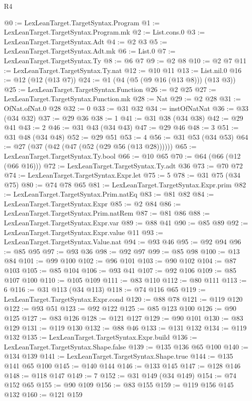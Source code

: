 \begin{lexlean}{R4}
\begin{coremodule}
@0 := LexLeanTarget.TargetSyntax.Program
@1 := LexLeanTarget.TargetSyntax.Program.mk
@2 := List.cons.{0}
@3 := LexLeanTarget.TargetSyntax.Adt
@4 := @2 @3
@5 := LexLeanTarget.TargetSyntax.Adt.mk
@6 := List.{0}
@7 := LexLeanTarget.TargetSyntax.Ty
@8 := @6 @7
@9 := @2 @8
@10 := @2 @7
@11 := LexLeanTarget.TargetSyntax.Ty.nat
@12 := @10 @11
@13 := List.nil.{0}
@16 := @12 (@12 (@13 @7))
@24 := @1 (@4 (@5 (@9 @16 (@13 @8))) (@13 @3))
@25 := LexLeanTarget.TargetSyntax.Function
@26 := @2 @25
@27 := LexLeanTarget.TargetSyntax.Function.mk
@28 := Nat
@29 := @2 @28
@31 := OfNat.ofNat.{0} @28
@32 := 0
@33 := @31 @32
@34 := instOfNatNat
@36 := @33 (@34 @32)
@37 := @29 @36
@38 := 1
@41 := @31 @38 (@34 @38)
@42 := @29 @41
@43 := 2
@46 := @31 @43 (@34 @43)
@47 := @29 @46
@48 := 3
@51 := @31 @48 (@34 @48)
@52 := @29 @51
@53 := 4
@56 := @31 @53 (@34 @53)
@64 := @27 (@37 (@42 (@47 (@52 (@29 @56 (@13 @28))))))
@65 := LexLeanTarget.TargetSyntax.Ty.bool
@66 := @10 @65
@70 := @64 (@66 (@12 (@66 @16)))
@72 := LexLeanTarget.TargetSyntax.Ty.adt @36
@73 := @70 @72
@74 := LexLeanTarget.TargetSyntax.Expr.let
@75 := 5
@78 := @31 @75 (@34 @75)
@80 := @74 @78 @65
@81 := LexLeanTarget.TargetSyntax.Expr.prim
@82 := LexLeanTarget.TargetSyntax.Prim.natEq
@83 := @81 @82
@84 := LexLeanTarget.TargetSyntax.Expr
@85 := @2 @84
@86 := LexLeanTarget.TargetSyntax.Prim.natRem
@87 := @81 @86
@88 := LexLeanTarget.TargetSyntax.Expr.var
@89 := @88 @41
@90 := @85 @89
@92 := LexLeanTarget.TargetSyntax.Expr.value @11
@93 := LexLeanTarget.TargetSyntax.Value.nat
@94 := @93 @46
@95 := @92 @94
@96 := @85 @95
@97 := @93 @36
@98 := @92 @97
@99 := @85 @98
@100 := @13 @84
@101 := @99 @100
@102 := @96 @101
@103 := @90 @102
@104 := @87 @103
@105 := @85 @104
@106 := @93 @41
@107 := @92 @106
@109 := @85 @107 @100
@110 := @105 @109
@111 := @83 @110
@112 := @80 @111
@113 := 6
@116 := @31 @113 (@34 @113)
@118 := @74 @116 @65
@119 := LexLeanTarget.TargetSyntax.Expr.cond
@120 := @88 @78
@121 := @119 @120
@122 := @93 @51
@123 := @92 @122
@125 := @85 @123 @100
@126 := @90 @125
@127 := @83 @126
@128 := @121 @127
@129 := @90 @101
@130 := @83 @129
@131 := @119 @130
@132 := @88 @46
@133 := @131 @132
@134 := @119 @132
@135 := LexLeanTarget.TargetSyntax.Expr.build
@136 := LexLeanTarget.TargetSyntax.Shape.false
@139 := @135 @136 @65 @100
@140 := @134 @139
@141 := LexLeanTarget.TargetSyntax.Shape.true
@144 := @135 @141 @65 @100
@145 := @140 @144
@146 := @133 @145
@147 := @128 @146
@148 := @118 @147
@149 := 7
@152 := @31 @149 (@34 @149)
@154 := @74 @152 @65
@155 := @90 @109
@156 := @83 @155
@159 := @119 @156 @145 @132
@160 := @121 @159

\end{coremodule}
\end{lexlean}
